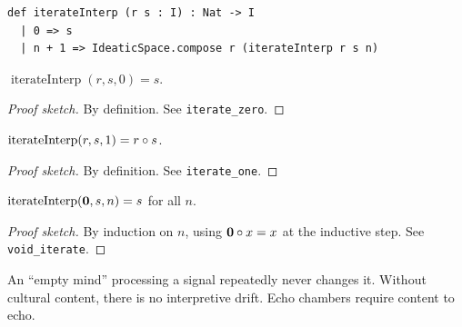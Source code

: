 \begin{lstlisting}[caption={Iterated interpretation in Lean~4},label=lst:iterate]
def iterateInterp (r s : I) : Nat -> I
  | 0 => s
  | n + 1 => IdeaticSpace.compose r (iterateInterp r s n)
\end{lstlisting}

\begin{theorem}[Zero Iteration = Raw Signal]
\label{thm:iterate-zero}
$\operatorname{iterateInterp}(r, s, 0) = s$.
\end{theorem}

\begin{proof}[Proof sketch]
By definition.  See \texttt{iterate\_zero}.
\end{proof}

\begin{theorem}[Single Iteration = Basic Interpretation]
\label{thm:iterate-one}
$\operatorname{iterateInterp}(r, s, 1) = r \circ s$.
\end{theorem}

\begin{proof}[Proof sketch]
By definition.  See \texttt{iterate\_one}.
\end{proof}

\begin{theorem}
\label{thm:void-iterate}
$\operatorname{iterateInterp}(\mathbf{0}, s, n) = s$ for all $n$.
\end{theorem}

\begin{proof}[Proof sketch]
By induction on $n$, using $\mathbf{0} \circ x = x$ at the inductive step.
See \texttt{void\_iterate}.
\end{proof}

\begin{remark}
An ``empty mind'' processing a signal repeatedly never changes it.
Without cultural content, there is no interpretive drift.  Echo chambers
require content to echo.
\end{remark}

